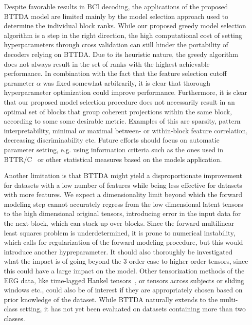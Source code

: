 \documentclass[twocolumn]{article}
\begin{document}
Despite favorable results in BCI decoding, the applications of the proposed
\textsc{BTTDA} model are limited mainly by the model selection approach used
to determine the individual block ranks.
While our proposed greedy model selection algorithm is a step in the right
direction, the high computational cost of setting hyperparameters through cross
validation can still hinder the portability of decoders relying on
\textsc{BTTDA}.
Due to its heuristic nature, the greedy algorithm does not always result in the
set of ranks with the highest achievable performance.
In combination with the fact that the feature selection cutoff parameter
$\alpha$ was fixed somewhat arbitrarily, it is clear that thorough
hyperparameter optimization could improve performance.
Furthermore, it is clear that our proposed model selection procedure does not
necessarily result in an optimal set of blocks that group coherent projections
within the same block, according to some some desirable metric.
Examples of this are sparsity, pattern interpretability, minimal or maximal between- or within-block feature
correlation, decreasing discriminability etc.
Future efforts should focus on automatic parameter setting, e.g. using
information criteria such as the ones used in BTTR/C~\cite{Faes2022} or other
statistical measures based on the models application.

Another limitation is that \textsc{BTTDA} might yield a disproportionate
improvement for datasets with a low number of features while being less effective
for datasets with more features.
We expect a dimensionality  limit beyond which the forward modeling step cannot
accurately regress from the low dimensional latent tensors to the high
dimensional original tensors, introducing
error in the input data for the next block, which can stack up over blocks.
Since the forward multilinear least squares problem is underdetermined, it is prone to
numerical instability, which calls for regularization of the forward modeling
procedure, but this would introduce another  hypreparameter.
It should also thoroughly be investigated what the impact is of going beyond
the 3-order case to higher-order tensors, since this could have a large impact
on the model.
Other tensorization methods of the EEG data, like time-lagged Hankel
tensors~\cite{Papy2005}, or tensors across subjects or sliding windows etc., could also be
of interest if they are appropriately chosen based on prior knowledge of the dataset.
While \textsc{BTTDA} naturally extends to the multi-class setting, it has not yet been
evaluated on datasets containing more than two classes.
\end{document}
